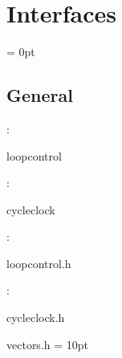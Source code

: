 
\section{Interfaces} 


\parskip = 0pt

\vspace{3mm} \subsection*{General}

: 

loopcontrol
\vspace{2mm}

: 

cycleclock
\vspace{2mm}

\vspace{5mm}

: 



loopcontrol.h
\vspace{2mm}

: 

cycleclock.h

vectors.h
\vspace{2mm}\parskip = 10pt 
